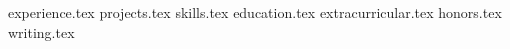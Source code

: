 \documentclass[11pt, a4paper]{awesome-cv}
\newcommand*{\sectiondir}{resume/}
\begin{document}
\makecvheader

{experience.tex}
{projects.tex}
{skills.tex}
{education.tex}
{extracurricular.tex}
{honors.tex}
{writing.tex}
\end{document}
